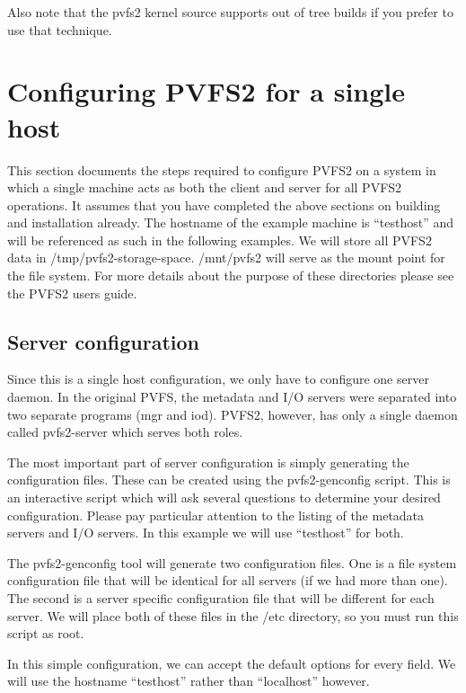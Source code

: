 \documentclass[11pt, letterpaper]{article}
\begin{document}
Also note that the pvfs2 kernel source supports out of tree builds if you 
prefer to use that technique.

\section{Configuring PVFS2 for a single host}
\label{sec:single}

This section documents the steps required to configure PVFS2 on a system
in which a single machine acts as both the client and server for all
PVFS2 operations.  It assumes that you have completed the above sections
on building and installation already.  The hostname of the example machine
is ``testhost'' and will be referenced as such in the following examples.
We will store all PVFS2 data in /tmp/pvfs2-storage-space.  /mnt/pvfs2 will
serve as the mount point for the file system.  For more details about
the purpose of these directories please see the PVFS2 users guide.

\subsection{Server configuration}

Since this is a single host configuration, we only have to configure one
server daemon.  In the original PVFS, the metadata and I/O servers were 
separated into two separate programs (mgr and iod).  PVFS2, however, has 
only a single daemon called pvfs2-server which serves both roles.

The most important part of server configuration is simply generating the 
configuration files.  These can be created using the pvfs2-genconfig 
script.  This is an interactive script which will ask several questions
to determine your desired configuration.  Please pay particular attention
to the listing of the metadata servers and I/O servers.  
In this example we will use ``testhost'' for both.  

The pvfs2-genconfig tool will generate two configuration files.  One is a file system configuration file that will be identical for all servers (if we had more than
one).  The second is a server specific configuration file that will be different for
each server.  We will place both of these files in the /etc directory, so you must run this script as root.  

In this simple configuration, we can accept the default options for every
field.  We will use the hostname ``testhost'' rather than ``localhost'' however.
\end{document}
